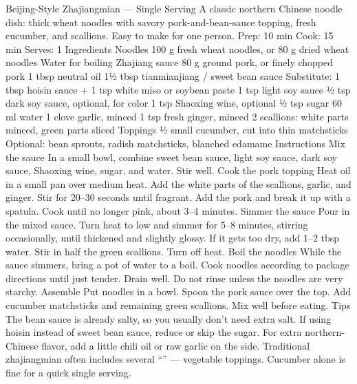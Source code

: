 Beijing-Style Zhajiangmian  — Single Serving A classic northern Chinese noodle dish: thick wheat noodles with savory pork-and-bean-sauce topping, fresh cucumber, and scallions. Easy to make for one person. Prep: 10 min Cook: 15 min Serves: 1 Ingredients Noodles 100 g fresh wheat noodles, or 80 g dried wheat noodles Water for boiling Zhajiang sauce 80 g ground pork, or finely chopped pork 1 tbsp neutral oil 1½ tbsp tianmianjiang / sweet bean sauce Substitute: 1 tbsp hoisin sauce + 1 tsp white miso or soybean paste 1 tsp light soy sauce ½ tsp dark soy sauce, optional, for color 1 tsp Shaoxing wine, optional ½ tsp sugar 60 ml water 1 clove garlic, minced 1 tsp fresh ginger, minced 2 scallions: white parts minced, green parts sliced Toppings ½ small cucumber, cut into thin matchsticks Optional: bean sprouts, radish matchsticks, blanched edamame Instructions Mix the sauce In a small bowl, combine sweet bean sauce, light soy sauce, dark soy sauce, Shaoxing wine, sugar, and water. Stir well. Cook the pork topping Heat oil in a small pan over medium heat. Add the white parts of the scallions, garlic, and ginger. Stir for 20–30 seconds until fragrant. Add the pork and break it up with a spatula. Cook until no longer pink, about 3–4 minutes. Simmer the sauce Pour in the mixed sauce. Turn heat to low and simmer for 5–8 minutes, stirring occasionally, until thickened and slightly glossy. If it gets too dry, add 1–2 tbsp water. Stir in half the green scallions. Turn off heat. Boil the noodles While the sauce simmers, bring a pot of water to a boil. Cook noodles according to package directions until just tender. Drain well. Do not rinse unless the noodles are very starchy. Assemble Put noodles in a bowl. Spoon the pork sauce over the top. Add cucumber matchsticks and remaining green scallions. Mix well before eating. Tips The bean sauce is already salty, so you usually don’t need extra salt. If using hoisin instead of sweet bean sauce, reduce or skip the sugar. For extra northern-Chinese flavor, add a little chili oil or raw garlic on the side. Traditional zhajiangmian often includes several “” — vegetable toppings. Cucumber alone is fine for a quick single serving.
\par

